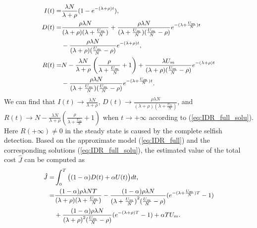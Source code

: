 \begin{equation}
\begin{small}
\label{eq:IDR_full_solu}
\begin{aligned}
I(t) =& \frac{ \lambda N }{ \lambda + \rho }
(1- e^{-(\lambda + \rho)t}),\\
D(t) =& \frac{ \rho \lambda N }{ (\lambda + \rho)
(\lambda + \frac{U_{m}}{N}) }
+ \frac{\rho \lambda N}{(\lambda + \frac{U_{m}}{N})
(\frac{U_{m}}{N} - \rho)}
e^{-(\lambda + \frac{U_{m}}{N})t}\\
& - \frac{ \rho \lambda N }{ (\lambda + \rho)
(\frac{U_{m}}{N} - \rho) }
e^{-(\lambda + \rho)t},\\
R(t) =& N - \frac{ \lambda N }{ \lambda + \rho }
\left( \frac{\rho}{\lambda + \frac{U_{m}}{N}} + 1 \right)
+ \frac{ \lambda U_{m} }{ (\lambda + \rho)
(\frac{U_{m}}{N} - \rho) } e^{-(\lambda + \rho)t}\\
& - \frac{\rho \lambda N}{(\lambda + \frac{U_{m}}{N})
(\frac{U_{m}}{N} - \rho)}  e^{-(\lambda + \frac{U_{m}}{N})t}.
\end{aligned}
\end{small}
\end{equation}
We can find that $I(t) \rightarrow
\frac{ \lambda N }{ \lambda + \rho }$,
$D(t) \rightarrow \frac{ \rho \lambda N }
{ (\lambda + \rho)(\lambda + \frac{U_{m}}{N}) }$,
and $R(t) \rightarrow
N - \frac{ \lambda N }{ \lambda + \rho }
\left( \frac{\rho}{\lambda + \frac{U_{m}}{N}} + 1 \right)$
when $t \rightarrow +\infty$ according to (\ref{eq:IDR_full_solu}).
Here $R(+\infty) \neq 0$ in the steady state
is caused by the complete selfish detection.
Based on the approximate model (\ref{eq:IDR_full})
and the corresponding solutions (\ref{eq:IDR_full_solu}),
the estimated value of the total cost $\hat{J}$
can be computed as
\begin{equation}
\begin{small}
\label{eq:IDR_full_J}
\begin{aligned}
\hat{J} =& \int_{0}^{T} \big( (1-\alpha) D(t) + \alpha U(t) \big) dt, \\
=& \frac{ (1-\alpha) \rho \lambda N T }{ (\lambda + \rho)(\lambda + \frac{U_{m}}{N}) }
- \frac{(1-\alpha) \rho \lambda N}{ {(\lambda + \frac{U_{m}}{N})}^{2} (\frac{U_{m}}{N} - \rho)}
(e^{-(\lambda + \frac{U_{m}}{N})T} - 1 ) \\
&+ \frac{(1-\alpha) \rho \lambda N }{ {(\lambda + \rho)}^{2} (\frac{U_{m}}{N} - \rho) }
(e^{-(\lambda + \rho)T} - 1 )
+ \alpha T U_{m}.
\end{aligned}
\end{small}
\end{equation}

